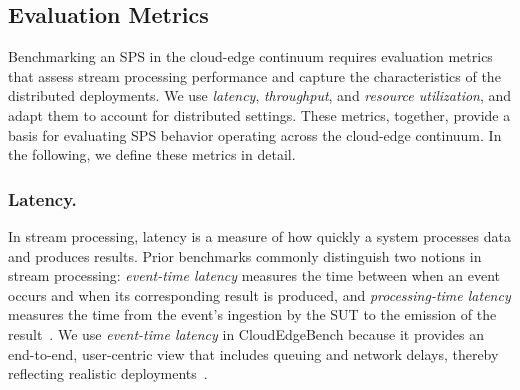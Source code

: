 \documentclass[runningheads]{llncs}
\begin{document}
\subsection{Evaluation Metrics}\label{sec:evaluation-metrics}

Benchmarking an SPS in the cloud-edge continuum requires evaluation metrics that assess stream processing performance and capture the characteristics of the distributed deployments.
We use \textit{latency}, \textit{throughput}, and \textit{resource utilization}, and adapt them to account for distributed settings.
These metrics, together, provide a basis for evaluating SPS behavior operating across the cloud-edge continuum.
In the following, we define these metrics in detail.


\subsubsection{Latency.}
In stream processing, latency is a measure of how quickly a system processes data and produces results.
Prior benchmarks commonly distinguish two notions in stream processing: \textit{event-time latency} measures the time between when an event occurs and when its corresponding result is produced, and \textit{processing-time latency} measures the time from the event's ingestion by the SUT to the emission of the result~\cite{karimov2018}.
We use \textit{event-time latency} in CloudEdgeBench because it provides an end-to-end, user-centric view that includes queuing and network delays, thereby reflecting realistic deployments~\cite{lohrmann16,hesse22}. %
\end{document}
